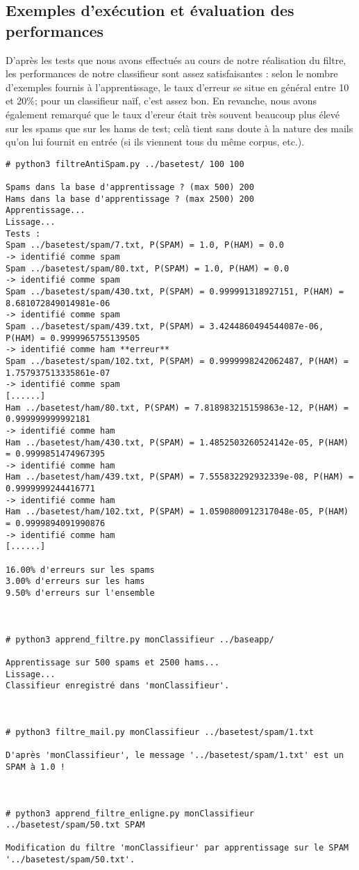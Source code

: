 \documentclass{report}
\begin{document}
\newpage
\subsection*{Exemples d'exécution et évaluation des performances}


\noindent D'après les tests que nous avons effectués au cours de notre réalisation du filtre, les performances de notre classifieur sont assez satisfaisantes : selon le nombre d'exemples fournis à l'apprentissage, le taux d'erreur se situe en général entre 10 et 20\%; pour un classifieur naïf, c'est assez bon. En revanche, nous avons également remarqué que le taux d'ereur était très souvent beaucoup plus élevé sur les spams que sur les hams de test; celà tient sans doute à la nature des mails qu'on lui fournit en entrée (si ils viennent tous du même corpus, etc.).

\begin{lstlisting}
# python3 filtreAntiSpam.py ../basetest/ 100 100
  
Spams dans la base d'apprentissage ? (max 500) 200
Hams dans la base d'apprentissage ? (max 2500) 200
Apprentissage...
Lissage...
Tests :
Spam ../basetest/spam/7.txt, P(SPAM) = 1.0, P(HAM) = 0.0
-> identifié comme spam
Spam ../basetest/spam/80.txt, P(SPAM) = 1.0, P(HAM) = 0.0
-> identifié comme spam
Spam ../basetest/spam/430.txt, P(SPAM) = 0.999991318927151, P(HAM) = 8.681072849014981e-06
-> identifié comme spam
Spam ../basetest/spam/439.txt, P(SPAM) = 3.4244860494544087e-06, P(HAM) = 0.9999965755139505
-> identifié comme ham **erreur**
Spam ../basetest/spam/102.txt, P(SPAM) = 0.9999998242062487, P(HAM) = 1.757937513335861e-07
-> identifié comme spam
[......]
Ham ../basetest/ham/80.txt, P(SPAM) = 7.818983215159863e-12, P(HAM) = 0.999999999992181
-> identifié comme ham
Ham ../basetest/ham/430.txt, P(SPAM) = 1.4852503260524142e-05, P(HAM) = 0.9999851474967395
-> identifié comme ham
Ham ../basetest/ham/439.txt, P(SPAM) = 7.555832292932339e-08, P(HAM) = 0.9999999244416771
-> identifié comme ham
Ham ../basetest/ham/102.txt, P(SPAM) = 1.0590800912317048e-05, P(HAM) = 0.9999894091990876
-> identifié comme ham
[......]

16.00% d'erreurs sur les spams
3.00% d'erreurs sur les hams
9.50% d'erreurs sur l'ensemble



# python3 apprend_filtre.py monClassifieur ../baseapp/

Apprentissage sur 500 spams et 2500 hams...
Lissage...
Classifieur enregistré dans 'monClassifieur'.



# python3 filtre_mail.py monClassifieur ../basetest/spam/1.txt

D'après 'monClassifieur', le message '../basetest/spam/1.txt' est un SPAM à 1.0 !



# python3 apprend_filtre_enligne.py monClassifieur ../basetest/spam/50.txt SPAM

Modification du filtre 'monClassifieur' par apprentissage sur le SPAM '../basetest/spam/50.txt'.
\end{lstlisting}
\end{document}

